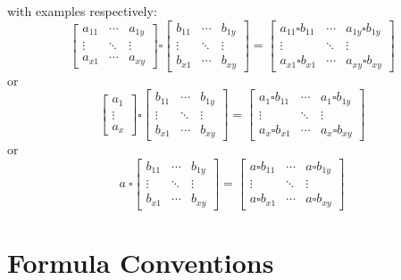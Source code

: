\documentclass[
  oneside]{book}
\begin{document}
with examples respectively:
\[
\begin{bmatrix}a_{11} &\cdots  & a_{1y} \\ \vdots & \ddots & \vdots  \\ a_{x1} & \cdots & a_{xy} \end{bmatrix}
\square
\begin{bmatrix}b_{11} &\cdots  & b_{1y} \\ \vdots & \ddots & \vdots  \\ b_{x1} & \cdots & b_{xy} \end{bmatrix}
=
\begin{bmatrix}a_{11} \square b_{11} &\cdots  & a_{1y} \square b_{1y} \\ \vdots & \ddots & \vdots  \\ a_{x1} \square b_{x1}  & \cdots & a_{xy} \square b_{xy} \end{bmatrix}
\]
or
\[
\begin{bmatrix}a_{1} \\ \vdots \\ a_{x} \end{bmatrix}
\square
\begin{bmatrix}b_{11} &\cdots  & b_{1y} \\ \vdots & \ddots & \vdots  \\ b_{x1} & \cdots & b_{xy} \end{bmatrix}
=
\begin{bmatrix}a_{1} \square b_{11} &\cdots  & a_{1} \square b_{1y} \\ \vdots & \ddots & \vdots  \\ a_{x} \square b_{x1}  & \cdots & a_{x} \square b_{xy} \end{bmatrix}
\]
or
\[
a \ 
\square
\begin{bmatrix}b_{11} &\cdots  & b_{1y} \\ \vdots & \ddots & \vdots  \\ b_{x1} & \cdots & b_{xy} \end{bmatrix}
=
\begin{bmatrix}a \square b_{11} &\cdots  & a \square b_{1y} \\ \vdots & \ddots & \vdots  \\ a \square b_{x1}  & \cdots & a \square b_{xy} \end{bmatrix}
\]

\hypertarget{formula-conventions}{%
\section{Formula Conventions}\label{formula-conventions}}
\end{document}
